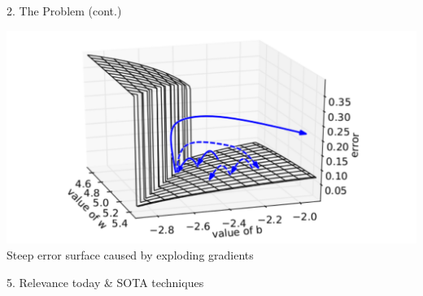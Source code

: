 \documentclass[final]{beamer}
\begin{document}
\begin{frame}[t]
\begin{columns}[t,totalwidth=\textwidth]
\begin{column}{0.3\textwidth}
\begin{block}{2. The Problem (cont.)}
    \begin{center}
        \includegraphics[width=0.9\linewidth]{figures/geometric.png} \\
        \small Steep error surface caused by exploding gradients
    \end{center}

    \end{block}



    \begin{block}{5. Relevance today \& SOTA techniques}

 
        

\end{block}
\end{column}
\end{columns}
\end{frame}
\end{document}
